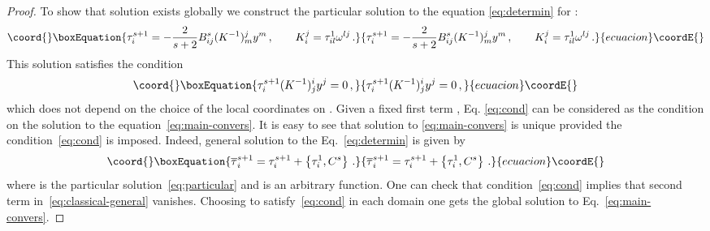 \documentclass[a4paper,11pt,oneside]{amsart}
\theoremstyle{plain}
\numberwithin{equation}{section} %
\numberwithin{figure}{section} %
\providecommand{\pb}[2]{\left\{{}#1{},{}#2{}\right\}}
\def\bar{\overline}
\def\manM{{\mathcal M}}
\begin{document}
\begin{proof}
\noindent
To show that solution exists globally we construct the
particular solution to the equation \eqref{eq:determin} for
\coordHE{}:
\begin{equation}\coord{}\boxEquation{
\label{eq:particular}
  \tau^{s+1}_i=
-\frac{2}{s+2}
B^s_{ij} (K^{-1})^j_m  y^m\,, \qquad K_i^j=\tau^1_{il}\omega^{lj}\,.
}{
\tau^{s+1}_i=
-\frac{2}{s+2}
B^s_{ij} (K^{-1})^j_m  y^m\,, \qquad K_i^j=\tau^1_{il}\omega^{lj}\,.
}{ecuacion}\coordE{}\end{equation}
This solution satisfies the condition
\begin{equation}\coord{}\boxEquation{
\label{eq:cond}
  \tau^{s+1}_i (K^{-1})^i_j y^j=0\,,
}{
\tau^{s+1}_i (K^{-1})^i_j y^j=0\,,
}{ecuacion}\coordE{}\end{equation}
which does not depend on the choice of
the local coordinates on \myHighlight{$\manM$}\coordHE{}.  Given a fixed first
term \coordHE{}, Eq. \eqref{eq:cond} can be considered
as the condition on the solution to the
equation~\eqref{eq:main-convers}.  It is easy to see that solution to
\eqref{eq:main-convers} is unique provided the condition~\eqref{eq:cond}
is imposed.  Indeed, general solution to the Eq.~\eqref{eq:determin} is
given by
\begin{equation}\coord{}\boxEquation{
\label{eq:classical-general}
{\bar\tau}_i^{s+1}=\tau_i^{s+1}+\pb{\tau^1_i}{C^s}\,.
}{
{\bar\tau}_i^{s+1}=\tau_i^{s+1}+\pb{\tau^1_i}{C^s}\,.
}{ecuacion}\coordE{}\end{equation}
where \coordHE{} is the particular solution~\eqref{eq:particular}
and \coordHE{} is an arbitrary function. One can check
that condition~\eqref{eq:cond} implies that second term
in~\eqref{eq:classical-general} vanishes.  Choosing \coordHE{}
to satisfy~\eqref{eq:cond} in each domain \coordHE{} one gets
the global solution to Eq.~\eqref{eq:main-convers}.
\end{proof}
\end{document}
